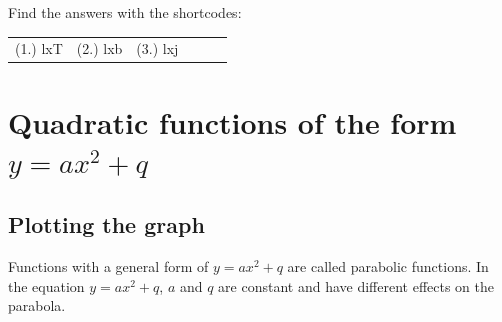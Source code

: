 \begin{exercises}{}
{\par {} Find the answers with the shortcodes:
\par \begin{tabular}[h]{cccccc}
(1.) lxT  &  (2.) lxb  &  (3.) lxj  & \end{tabular}
}
\end{exercises}
   

\section{Quadratic functions of the form $y=a{x}^{2}+q$}
\subsection*{Plotting the graph}         
Functions with a general form of $y=a{x}^{2}+q$ are called parabolic functions. In the equation $y=a{x}^{2}+q$, $a$ and $q$ are constant and have different effects on the parabola. 

